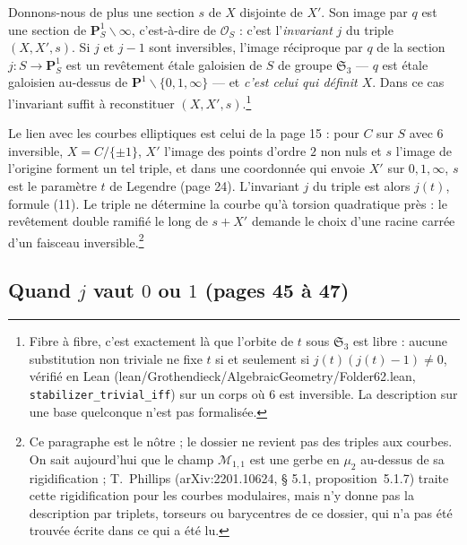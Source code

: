\documentclass[11pt,a4paper]{article}
\begin{document}
Donnons-nous de plus une section $s$ de $X$ disjointe de $X'$. Son image par $q$
est une section de $\mathbf{P}^1_S \smallsetminus \infty$, c'est-à-dire de
$\mathcal{O}_S$ : c'est l'\emph{invariant} $j$ du triple $(X, X', s)$. Si $j$
et $j - 1$ sont inversibles, l'image réciproque par $q$ de la section $j\colon
S \to \mathbf{P}^1_S$ est un revêtement étale galoisien de $S$ de groupe
$\mathfrak{S}_3$ --- $q$ est étale galoisien au-dessus de $\mathbf{P}^1
\smallsetminus \{0, 1, \infty\}$ --- et \emph{c'est celui qui définit $X$}.
Dans ce cas l'invariant suffit à reconstituer $(X, X', s)$.\footnote{Fibre à
fibre, c'est exactement là que l'orbite de $t$ sous $\mathfrak{S}_3$ est
libre : aucune substitution non triviale ne fixe $t$ si et seulement si
$j(t)(j(t) - 1) \neq 0$, vérifié en Lean (lean/Grothendieck/AlgebraicGeometry/Folder62.lean,
\texttt{stabilizer\_trivial\_iff}) sur un corps où $6$ est inversible. La
description sur une base quelconque n'est pas formalisée.}

Le lien avec les courbes elliptiques est celui de la page 15 : pour $C$ sur $S$
avec $6$ inversible, $X = C/\{\pm 1\}$, $X'$ l'image des points d'ordre $2$
non nuls et $s$ l'image de l'origine forment un tel triple, et dans une
coordonnée qui envoie $X'$ sur $0, 1, \infty$, $s$ est le paramètre $t$ de
Legendre (page 24). L'invariant $j$ du triple est alors $j(t)$, formule (11).
Le triple ne détermine la courbe qu'à torsion quadratique près : le revêtement
double ramifié le long de $s + X'$ demande le choix d'une racine carrée d'un
faisceau inversible.\footnote{Ce paragraphe est le nôtre ; le dossier ne
revient pas des triples aux courbes. On sait aujourd'hui que le champ
$\mathcal{M}_{1,1}$ est une gerbe en $\mu_2$ au-dessus de sa rigidification ;
T.~Phillips (arXiv:2201.10624, § 5.1, proposition~5.1.7) traite cette
rigidification pour les courbes modulaires, mais n'y donne pas la description
par triplets, torseurs ou barycentres de ce dossier, qui n'a pas été trouvée
écrite dans ce qui a été lu.}

\subsection*{Quand $j$ vaut $0$ ou $1$ (pages 45 à 47)}
\end{document}
